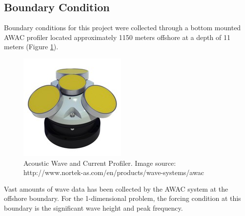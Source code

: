 \subsection{Boundary Condition}
\label{BC}

	Boundary conditions for this project were collected through a bottom mounted AWAC profiler located approximately 1150 meters offshore at a depth of 11 meters (Figure \ref{AWAC}).

	\begin{figure}[h]
		\centering
		\includegraphics[width=.40\linewidth]{img/AWAC.jpg}
		\caption{Acoustic Wave and Current Profiler. Image source: http://www.nortek-as.com/en/products/wave-systems/awac}
		\label{AWAC}
	\end{figure}
	
	Vast amounts of wave data has been collected by the AWAC system at the offshore boundary. For the 1-dimensional problem, the forcing condition at this boundary is the significant wave height and peak frequency.
